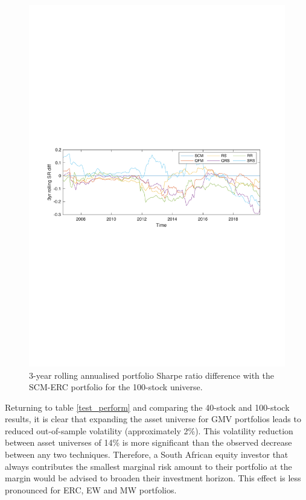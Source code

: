 \documentclass[a4paper,11pt,nocenter,bold,noupper,headcount]{mythesis}
\theoremstyle{plain}
\theoremstyle{definition}
\begin{document}
\begin{figure}[H]
\includegraphics[width=14.5cm]{n100_3yr_roll_sr.pdf}
\caption{3-year rolling annualised portfolio Sharpe ratio difference with the SCM-ERC portfolio for the 100-stock universe.}
\label{ERC_comp_100}
\end{figure}

Returning to table \ref{test_perform} and comparing the 40-stock and 100-stock results, it is clear that expanding the asset universe for GMV portfolios leads to reduced out-of-sample volatility (approximately 2\%). This volatility reduction between asset universes of 14\% is more significant than the observed decrease between any two techniques. Therefore, a South African equity investor that always contributes the smallest marginal risk amount to their portfolio at the margin would be advised to broaden their investment horizon. This effect is less pronounced for ERC, EW and MW portfolios.
\end{document}

